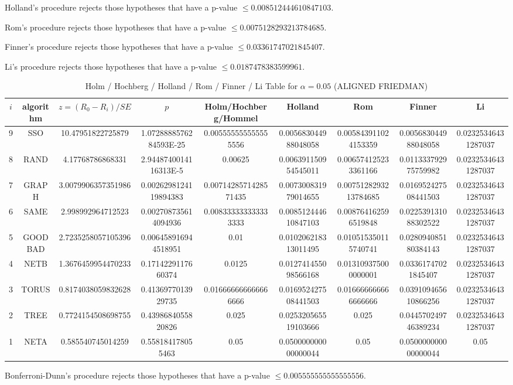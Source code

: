 \documentclass[a4paper,10pt]{article}
\begin{document}
\begin{landscape}
Holland's procedure rejects those hypotheses that have a p-value $\le0.008512444610847103$.


Rom's procedure rejects those hypotheses that have a p-value $\le0.0075128293213784685$.


Finner's procedure rejects those hypotheses that have a p-value $\le0.03361747021845407$.


Li's procedure rejects those hypotheses that have a p-value $\le0.0187478383599961$.



\newpage

\begin{table}[!htp]
\centering\scriptsize
\caption{Holm / Hochberg / Holland / Rom / Finner / Li Table for $\alpha=0.05$ (ALIGNED FRIEDMAN)}
\begin{tabular}{ccccccccc}
$i$&algorithm&$z=(R_0 - R_i)/SE$&$p$&Holm/Hochberg/Hommel&Holland&Rom&Finner&Li\\
\hline
9& SSO&10.47951822725879&1.0728888576284593E-25&0.005555555555555556&0.005683044988048058&0.005843911024153359&0.005683044988048058&0.02325346431287037\\
8& RAND&4.17768786868331&2.9448740014116313E-5&0.00625&0.006391150954545011&0.006574125233361166&0.011333792975759982&0.02325346431287037\\
7& GRAPH&3.0079906357351986&0.0026298124119894383&0.0071428571428571435&0.007300831979014655&0.0075128293213784685&0.016952427508441503&0.02325346431287037\\
6& SAME&2.998992964712523&0.002708735614094936&0.008333333333333333&0.008512444610847103&0.008764162596519848&0.022539131088302522&0.02325346431287037\\
5& GOODBAD&2.7235258057105396&0.006458916944518951&0.01&0.010206218313011495&0.010515350115740741&0.028094085180384143&0.02325346431287037\\
4& NETB&1.3676459954470233&0.1714229117660374&0.0125&0.012741455098566168&0.013109375000000001&0.03361747021845407&0.02325346431287037\\
3& TORUS&0.8174038059832628&0.4136977013929735&0.016666666666666666&0.016952427508441503&0.016666666666666666&0.039109465610866256&0.02325346431287037\\
2& TREE&0.7724154508698755&0.4398684055820826&0.025&0.025320565519103666&0.025&0.044570249746389234&0.02325346431287037\\
1& NETA&0.585540745014259&0.558184178055463&0.05&0.050000000000000044&0.05&0.050000000000000044&0.05\\
\hline
\end{tabular}
\end{table}
Bonferroni-Dunn's procedure rejects those hypotheses that have a p-value $\le0.005555555555555556$.



\end{landscape}
\end{document}
